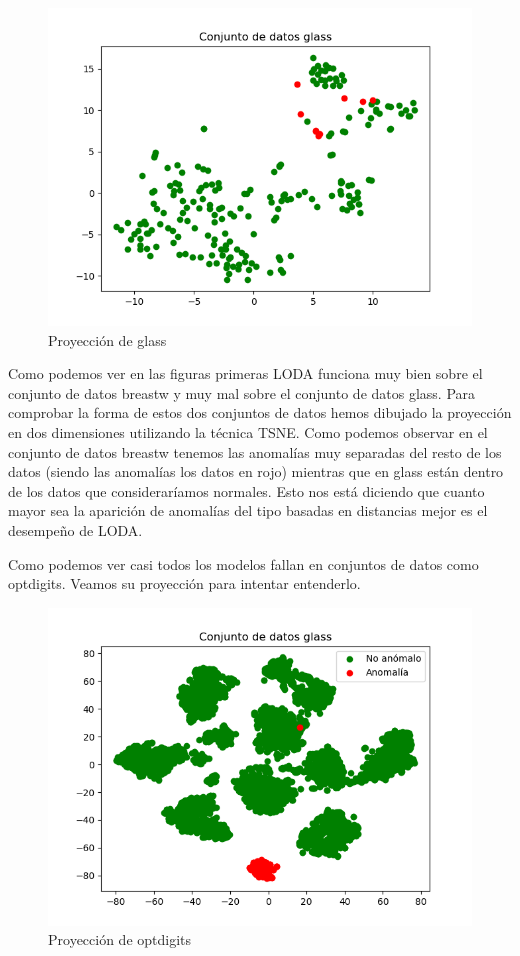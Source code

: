 \begin{figure}[H]
	\centering
	\includegraphics[scale=0.7]{imagenes/glass}
	\caption{Proyección de glass}
	\label{glass}
\end{figure}

Como podemos ver en las figuras primeras LODA funciona muy bien sobre el conjunto de datos breastw y muy mal sobre el conjunto de datos glass. Para comprobar la forma de estos dos conjuntos de datos hemos dibujado la proyección en dos dimensiones utilizando la técnica TSNE. Como podemos observar en el conjunto de datos breastw tenemos las anomalías muy separadas del resto de los datos (siendo las anomalías los datos en rojo) mientras que en glass están dentro de los datos que consideraríamos normales. Esto nos está diciendo que cuanto mayor sea la aparición de anomalías del tipo basadas en distancias mejor es el desempeño de LODA. 

Como podemos ver casi todos los modelos fallan en conjuntos de datos como optdigits. Veamos su proyección para intentar entenderlo.

\begin{figure}[H]
	\centering
	\includegraphics[scale=0.7]{imagenes/optdigits}
	\caption{Proyección de optdigits}
	\label{optdigits}
\end{figure}

